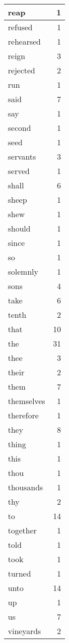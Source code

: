 \begin{center}
\begin{longtable}{l|r}
reap & 1 \\ \hline
refused & 1 \\ \hline
rehearsed & 1 \\ \hline
reign & 3 \\ \hline
rejected & 2 \\ \hline
run & 1 \\ \hline
said & 7 \\ \hline
say & 1 \\ \hline
second & 1 \\ \hline
seed & 1 \\ \hline
servants & 3 \\ \hline
served & 1 \\ \hline
shall & 6 \\ \hline
sheep & 1 \\ \hline
shew & 1 \\ \hline
should & 1 \\ \hline
since & 1 \\ \hline
so & 1 \\ \hline
solemnly & 1 \\ \hline
sons & 4 \\ \hline
take & 6 \\ \hline
tenth & 2 \\ \hline
that & 10 \\ \hline
the & 31 \\ \hline
thee & 3 \\ \hline
their & 2 \\ \hline
them & 7 \\ \hline
themselves & 1 \\ \hline
therefore & 1 \\ \hline
they & 8 \\ \hline
thing & 1 \\ \hline
this & 1 \\ \hline
thou & 1 \\ \hline
thousands & 1 \\ \hline
thy & 2 \\ \hline
to & 14 \\ \hline
together & 1 \\ \hline
told & 1 \\ \hline
took & 1 \\ \hline
turned & 1 \\ \hline
unto & 14 \\ \hline
up & 1 \\ \hline
us & 7 \\ \hline
vineyards & 2 \\ \hline

\end{longtable}
\end{center}
